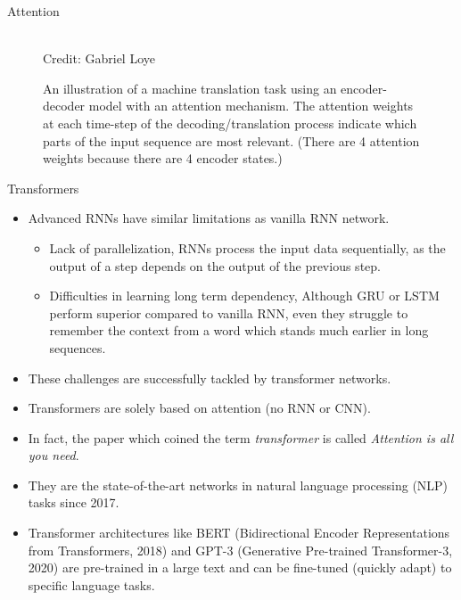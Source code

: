 \begin{vbframe}{Attention}
\framebreak
  
  \lz
  \lz
  \begin{figure}
    \centering
    \tiny{\\Credit: Gabriel Loye}
    \caption{\footnotesize An illustration of a machine translation task using an encoder-decoder model with an attention mechanism. The attention weights at each time-step of the decoding/translation process indicate which parts of the input sequence are most relevant. (There are 4 attention weights because there are 4 encoder states.)}
  \end{figure}
\end{vbframe}

\begin{vbframe}{Transformers}
  \begin{itemize}
    \item Advanced RNNs have similar limitations as vanilla RNN network.
    \begin{itemize}
      \item Lack of parallelization, RNNs process the input data sequentially, as the output of a step depends on the output of the previous step.
     \item Difficulties in learning long term dependency, Although GRU or LSTM perform superior compared to vanilla RNN, even they struggle to remember the context from a word which stands much earlier in long sequences.
    \end{itemize}
    \item These challenges are successfully tackled by transformer networks.
    
    \framebreak
    
    \item Transformers are solely based on attention (no RNN or CNN).
    \item In fact, the paper which coined the term \textit{transformer} is called \textit{Attention is all you need}.
    \item They are the state-of-the-art networks in natural language processing (NLP) tasks since 2017.
    \item Transformer architectures like BERT (Bidirectional Encoder Representations from Transformers, 2018) and GPT-3 (Generative Pre-trained Transformer-3, 2020) are pre-trained in a large text and can be fine-tuned (quickly adapt) to specific language tasks.
  \end{itemize}
\end{vbframe}





